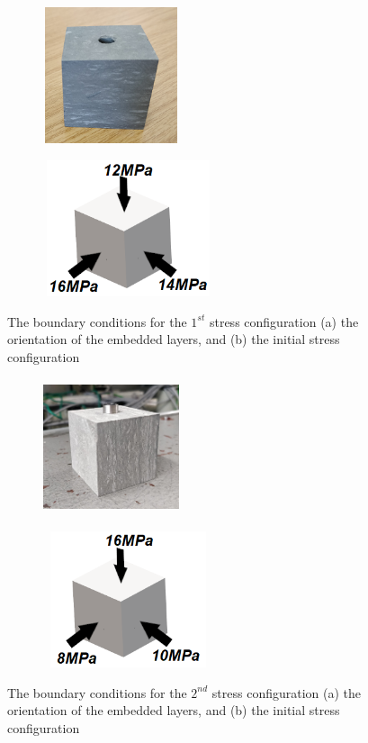 \begin{figure}[!ht]
\begin{subfigure}[c]{0.48\textwidth}
\includegraphics[width=4cm,height=4cm]{figures/Amir_Percolation_Orientation1.png}
\subcaption{}
\label{fig:Amir_Percolation_Orientation1}
\end{subfigure}
\hfill
\begin{subfigure}[c]{0.48\textwidth}
\includegraphics[width=5cm,height=4cm]{figures/Amir_Percolation_Stress_1.png}
\subcaption{}
\label{fig:Amir_Percolation_Stress_1}
\end{subfigure}
\caption{The boundary conditions for the $1^{st}$ stress configuration (a) the orientation of the embedded layers, and (b) the initial stress configuration}
\end{figure}

\begin{figure}[!ht]
\begin{subfigure}[c]{0.48\textwidth}
\includegraphics[width=4cm,height=4cm]{figures/Amir_Percolation_Orientation2.png}
\subcaption{}
\label{fig:Amir_Percolation_Orientation2}
\end{subfigure}
\hfill
\begin{subfigure}[c]{0.48\textwidth}
\includegraphics[width=5cm,height=4cm]{figures/Amir_Percolation_Stress_2.png}
\subcaption{}
\label{fig:Amir_Percolation_Stress_2}
\end{subfigure}
\caption{The boundary conditions for the $2^{nd}$ stress configuration  (a) the orientation of the embedded layers, and (b) the initial stress configuration}
\end{figure}

